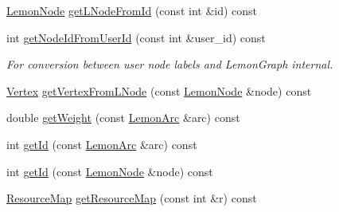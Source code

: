 \begin{DoxyCompactItemize}
\item 
\hyperlink{digraph_8h_a9e28ff6f29770c88642a42cab9f42fed}{Lemon\+Node} \hyperlink{classbidirectional_1_1DiGraph_a966eb000fda1f5dac268f8f4ae6b19cb}{get\+L\+Node\+From\+Id} (const int \&id) const
\item 
int \hyperlink{classbidirectional_1_1DiGraph_a9b6d435d6eac3751da5b2ee427826657}{get\+Node\+Id\+From\+User\+Id} (const int \&user\+\_\+id) const
\begin{DoxyCompactList}\small\item\em For conversion between user node labels and Lemon\+Graph internal. \end{DoxyCompactList}\item 
\hyperlink{structbidirectional_1_1Vertex}{Vertex} \hyperlink{classbidirectional_1_1DiGraph_aba1a01186d95c4a9ac73031ed1de5432}{get\+Vertex\+From\+L\+Node} (const \hyperlink{digraph_8h_a9e28ff6f29770c88642a42cab9f42fed}{Lemon\+Node} \&node) const
\item 
double \hyperlink{classbidirectional_1_1DiGraph_afed51610b271cdaa05168f3a38ad8e07}{get\+Weight} (const \hyperlink{digraph_8h_ae6cfd87753a14ebe6d11871314aff34d}{Lemon\+Arc} \&arc) const
\item 
int \hyperlink{classbidirectional_1_1DiGraph_a7b16dcef9b23770124b19a295f06178a}{get\+Id} (const \hyperlink{digraph_8h_ae6cfd87753a14ebe6d11871314aff34d}{Lemon\+Arc} \&arc) const
\item 
int \hyperlink{classbidirectional_1_1DiGraph_afb87bafec6ea1764bd19509f0b0ca4e9}{get\+Id} (const \hyperlink{digraph_8h_a9e28ff6f29770c88642a42cab9f42fed}{Lemon\+Node} \&node) const
\item 
\hyperlink{classbidirectional_1_1ResourceMap}{Resource\+Map} \hyperlink{classbidirectional_1_1DiGraph_a45a3d6b4164c0881cdad5ab23aa9eda8}{get\+Resource\+Map} (const int \&r) const
\end{DoxyCompactItemize}
